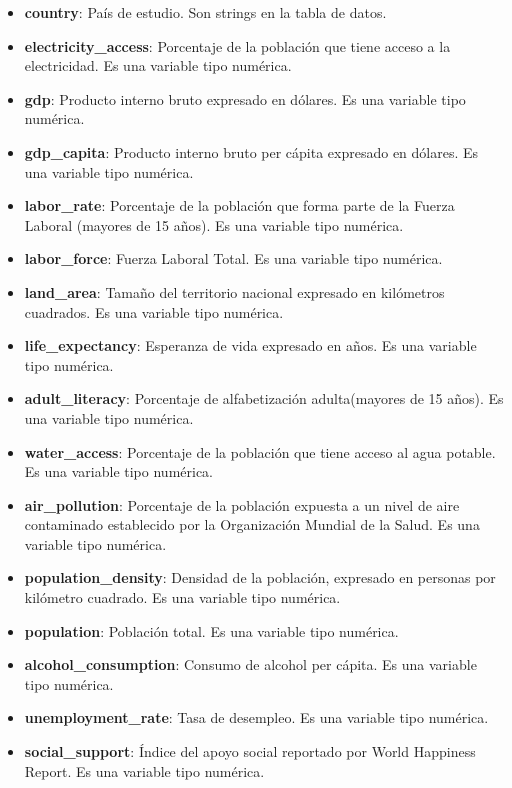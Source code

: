 \begin{itemize}
    \begin{itemize}
        \item \textbf{country}: País de estudio. Son strings en la tabla de datos.
        \item \textbf{electricity\_access}: Porcentaje de la población que tiene acceso a la electricidad. Es una variable tipo numérica.
        \item \textbf{gdp}: Producto interno bruto expresado en dólares. Es una variable tipo numérica.
        \item \textbf{gdp\_capita}: Producto interno bruto per cápita expresado en dólares. Es una variable tipo numérica.
        \item \textbf{labor\_rate}: Porcentaje de la población que forma parte de la Fuerza Laboral (mayores de 15 años). Es una variable tipo numérica.
        \item \textbf{labor\_force}: Fuerza Laboral Total. Es una variable tipo numérica.
        \item \textbf{land\_area}: Tamaño del territorio nacional expresado en kilómetros cuadrados. Es una variable tipo numérica.
        \item \textbf{life\_expectancy}: Esperanza de vida expresado en años. Es una variable tipo numérica.
        \item \textbf{adult\_literacy}: Porcentaje de alfabetización adulta(mayores de 15 años). Es una variable tipo numérica.
        \item \textbf{water\_access}: Porcentaje de la población que tiene acceso al agua potable. Es una variable tipo numérica.
        \item \textbf{air\_pollution}: Porcentaje de la población expuesta a un nivel de aire contaminado establecido por la Organización Mundial de la Salud. Es una variable tipo numérica.
        \item \textbf{population\_density}: Densidad de la población, expresado en personas por kilómetro cuadrado. Es una variable tipo numérica.
        \item \textbf{population}: Población total. Es una variable tipo numérica.
        \item \textbf{alcohol\_consumption}: Consumo de alcohol per cápita. Es una variable tipo numérica.
        \item \textbf{unemployment\_rate}: Tasa de desempleo. Es una variable tipo numérica.
        \item \textbf{social\_support}: Índice del apoyo social reportado por World Happiness Report. Es una variable tipo numérica.

\end{itemize}
\end{itemize}
